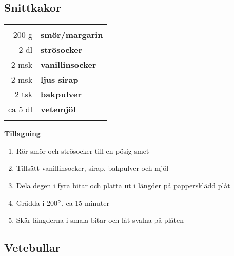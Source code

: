 \clearpage

\subsection{Snittkakor}

\begin{table}[H]
	\begin{tabular}{rl}
	\hline
	&\\
		200 g & \textbf{smör/margarin}\\
		2 dl & \textbf{strösocker}\\
		2 msk & \textbf{vanillinsocker}\\
		2 msk & \textbf{ljus sirap}\\
		2 tsk & \textbf{bakpulver}\\
		ca 5 dl & \textbf{vetemjöl}\\
	&\\
	\hline
	\end{tabular}
\end{table}

\begin{multicols*}{2}

\noindent \textbf{Tillagning}
\begin{enumerate}
	\itemsep0cm
	\item Rör smör och strösocker till en pösig smet
	\item Tillsätt vanillinsocker, sirap, bakpulver och mjöl
	\item Dela degen i fyra bitar och \mbox{platta} ut i längder på pappersklädd plåt
	\item Grädda i 200$\degree$, ca 15 minuter
	\item Skär längderna i smala bitar och låt svalna på plåten
\end{enumerate}

\end{multicols*}

\clearpage

\subsection{Vetebullar}

